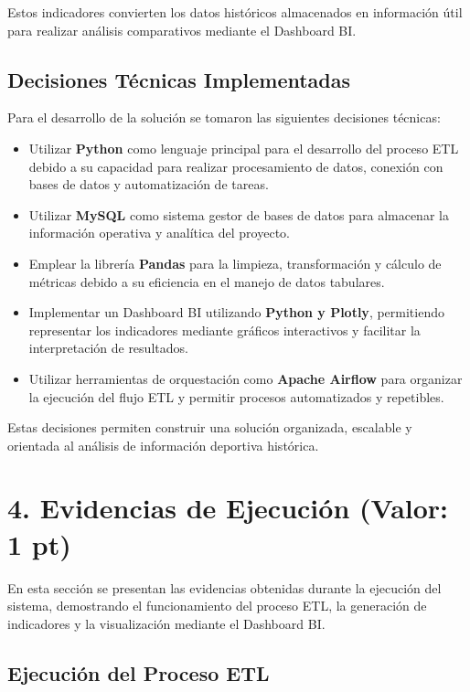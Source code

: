 \documentclass[
  letterpaper,
  DIV=11,
  numbers=noendperiod]{scrartcl}
\begin{document}
Estos indicadores convierten los datos históricos almacenados en
información útil para realizar análisis comparativos mediante el
Dashboard BI.

\subsection{Decisiones Técnicas
Implementadas}\label{decisiones-tuxe9cnicas-implementadas}

Para el desarrollo de la solución se tomaron las siguientes decisiones
técnicas:

\begin{itemize}
\item
  Utilizar \textbf{Python} como lenguaje principal para el desarrollo
  del proceso ETL debido a su capacidad para realizar procesamiento de
  datos, conexión con bases de datos y automatización de tareas.
\item
  Utilizar \textbf{MySQL} como sistema gestor de bases de datos para
  almacenar la información operativa y analítica del proyecto.
\item
  Emplear la librería \textbf{Pandas} para la limpieza, transformación y
  cálculo de métricas debido a su eficiencia en el manejo de datos
  tabulares.
\item
  Implementar un Dashboard BI utilizando \textbf{Python y Plotly},
  permitiendo representar los indicadores mediante gráficos interactivos
  y facilitar la interpretación de resultados.
\item
  Utilizar herramientas de orquestación como \textbf{Apache Airflow}
  para organizar la ejecución del flujo ETL y permitir procesos
  automatizados y repetibles.
\end{itemize}

Estas decisiones permiten construir una solución organizada, escalable y
orientada al análisis de información deportiva histórica.

\section{4. Evidencias de Ejecución (Valor: 1
pt)}\label{evidencias-de-ejecuciuxf3n-valor-1-pt}

En esta sección se presentan las evidencias obtenidas durante la
ejecución del sistema, demostrando el funcionamiento del proceso ETL, la
generación de indicadores y la visualización mediante el Dashboard BI.

\subsection{Ejecución del Proceso
ETL}\label{ejecuciuxf3n-del-proceso-etl}
\end{document}
